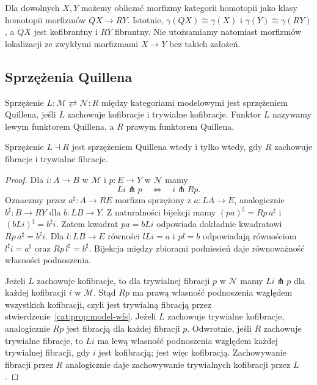 Dla dowolnych $X,Y$ możemy obliczać morfizmy kategorii homotopii jako klasy homotopii morfizmów $QX\to RY$. Istotnie, $\gamma(QX)\cong\gamma(X)$ i $\gamma(Y)\cong\gamma(RY)$, a $QX$ jest kofibrantny i $RY$ fibrantny. Nie utożsamiamy natomiast morfizmów lokalizacji ze zwykłymi morfizmami $X\to Y$ bez takich założeń.

\subsection{Sprzężenia Quillena}

\begin{definicja}\label{cat:def:quillen-adjunction}
Sprzężenie $L:\mathcal M\rightleftarrows\mathcal N:R$ między kategoriami modelowymi jest sprzężeniem Quillena, jeśli $L$ zachowuje kofibracje i trywialne kofibracje. Funktor $L$ nazywamy lewym funktorem Quillena, a $R$ prawym funktorem Quillena.
\end{definicja}

\begin{stwierdzenie}\label{cat:prop:quillen-right-criterion}
Sprzężenie $L\dashv R$ jest sprzężeniem Quillena wtedy i tylko wtedy, gdy $R$ zachowuje fibracje i trywialne fibracje.
\end{stwierdzenie}
\begin{proof}
Dla $i:A\to B$ w $\mathcal M$ i $p:E\to Y$ w $\mathcal N$ mamy
\[
 Li\pitchfork p\quad\Longleftrightarrow\quad i\pitchfork Rp.
\]
Oznaczmy przez $a^\sharp:A\to RE$ morfizm sprzężony z $a:LA\to E$, analogicznie $b^\sharp:B\to RY$ dla $b:LB\to Y$. Z naturalności bijekcji mamy $(pa)^\sharp=Rp\,a^\sharp$ i $(bLi)^\sharp=b^\sharp i$. Zatem kwadrat $pa=bLi$ odpowiada dokładnie kwadratowi $Rp\,a^\sharp=b^\sharp i$. Dla $l:LB\to E$ równości $lLi=a$ i $pl=b$ odpowiadają równościom $l^\sharp i=a^\sharp$ oraz $Rp\,l^\sharp=b^\sharp$. Bijekcja między zbiorami podniesień daje równoważność własności podnoszenia.

Jeżeli $L$ zachowuje kofibracje, to dla trywialnej fibracji $p$ w $\mathcal N$ mamy $Li\pitchfork p$ dla każdej kofibracji $i$ w $\mathcal M$. Stąd $Rp$ ma prawą własność podnoszenia względem wszystkich kofibracji, czyli jest trywialną fibracją przez stwierdzenie~\ref{cat:prop:model-wfs}. Jeżeli $L$ zachowuje trywialne kofibracje, analogicznie $Rp$ jest fibracją dla każdej fibracji $p$. Odwrotnie, jeśli $R$ zachowuje trywialne fibracje, to $Li$ ma lewą własność podnoszenia względem każdej trywialnej fibracji, gdy $i$ jest kofibracją; jest więc kofibracją. Zachowywanie fibracji przez $R$ analogicznie daje zachowywanie trywialnych kofibracji przez $L$.
\end{proof}

